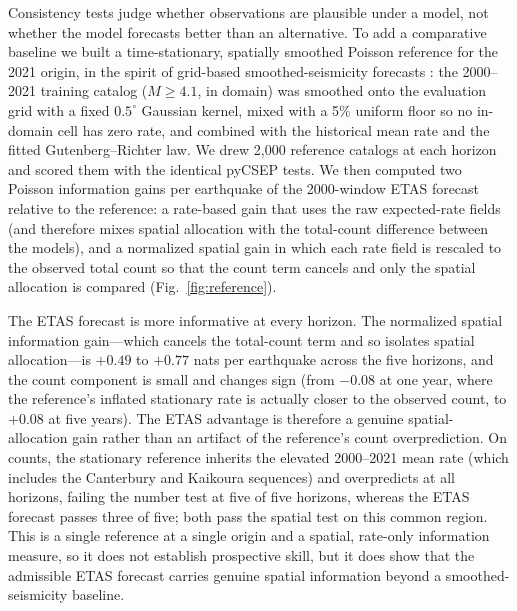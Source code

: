 \documentclass[12pt]{article}
\begin{document}
Consistency tests judge whether observations are plausible under a model, not
whether the model forecasts better than an alternative. To add a comparative
baseline we built a time-stationary, spatially smoothed Poisson reference for the
2021 origin, in the spirit of grid-based smoothed-seismicity forecasts
\citep{Helmstetter2007}: the 2000--2021 training catalog ($M\geq4.1$, in domain)
was smoothed onto the evaluation grid with a fixed $0.5^\circ$ Gaussian kernel,
mixed with a 5\% uniform floor so no in-domain cell has zero rate, and combined
with the historical mean rate and the fitted Gutenberg--Richter law. We drew
2{,}000 reference catalogs at each horizon and scored them with the identical
pyCSEP tests. We then computed two Poisson information gains per earthquake of
the 2000-window ETAS forecast relative to the reference: a rate-based gain that
uses the raw expected-rate fields (and therefore mixes spatial allocation with
the total-count difference between the models), and a normalized spatial gain in
which each rate field is rescaled to the observed total count so that the count
term cancels and only the spatial allocation is compared
(Fig.~\ref{fig:reference}).

The ETAS forecast is more informative at every horizon. The normalized spatial
information gain---which cancels the total-count term and so isolates spatial
allocation---is $+0.49$ to $+0.77$ nats per earthquake across the five horizons,
and the count component is small and changes sign (from $-0.08$ at one year,
where the reference's inflated stationary rate is actually closer to the
observed count, to $+0.08$ at five years). The ETAS advantage is therefore a
genuine spatial-allocation gain rather than an artifact of the reference's count
overprediction. On counts, the stationary reference inherits the elevated
2000--2021 mean rate (which includes the Canterbury and Kaikoura sequences) and
overpredicts at all horizons, failing the number test at five of five horizons,
whereas the ETAS forecast passes three of five; both pass the spatial test on
this common region. This is a single reference at a single origin and a spatial,
rate-only information measure, so it does not establish prospective skill, but it
does show that the admissible ETAS forecast carries genuine spatial information
beyond a smoothed-seismicity baseline.
\end{document}
